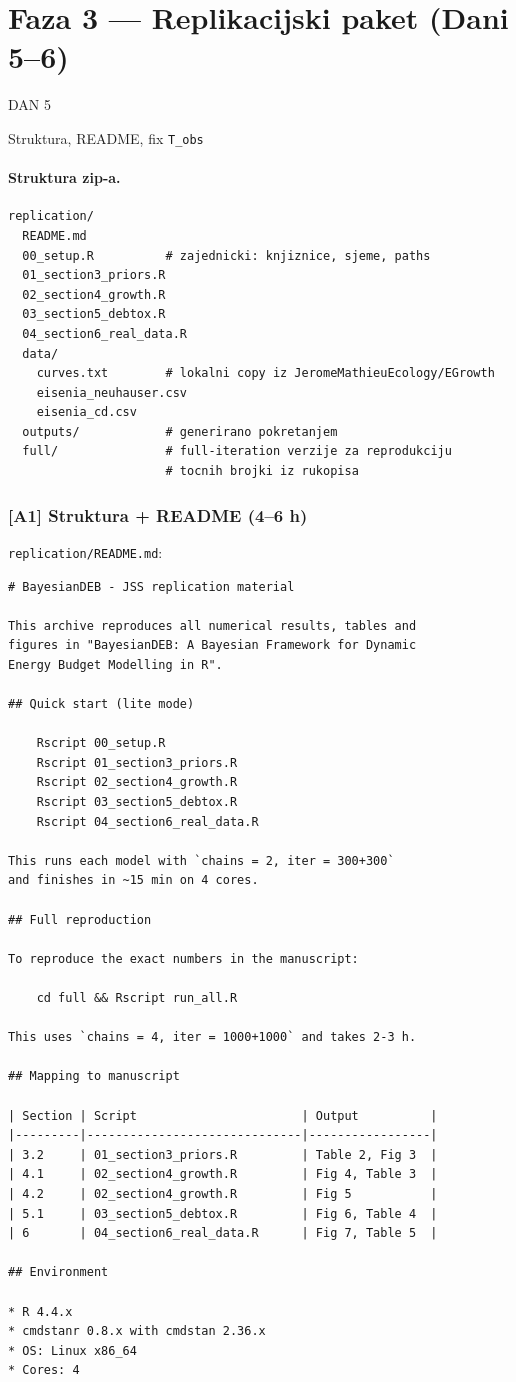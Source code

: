 \documentclass[11pt,a4paper]{article}
\newcommand{\dayhead}[2]{%
  \vspace{0.6em}\par\noindent%
  \colorbox{daygray}{\color{white}\bfseries\strut\;DAN #1\;}\;%
  \colorbox{daylight}{\color{daygray}\strut\;#2\;}\par\vspace{0.4em}%
}
\newcommand{\file}[1]{\texttt{\small #1}}
\begin{document}
\section{Faza 3 --- Replikacijski paket (Dani 5--6)}

\dayhead{5}{Struktura, README, fix \texttt{T\_obs}}

\paragraph{Struktura zip-a.}
\begin{lstlisting}[style=Shellstyle]
replication/
  README.md
  00_setup.R          # zajednicki: knjiznice, sjeme, paths
  01_section3_priors.R
  02_section4_growth.R
  03_section5_debtox.R
  04_section6_real_data.R
  data/
    curves.txt        # lokalni copy iz JeromeMathieuEcology/EGrowth
    eisenia_neuhauser.csv
    eisenia_cd.csv
  outputs/            # generirano pokretanjem
  full/               # full-iteration verzije za reprodukciju
                      # tocnih brojki iz rukopisa
\end{lstlisting}

\subsubsection*{[A1] Struktura + README (4--6 h)}

\file{replication/README.md}:

\begin{lstlisting}[style=Shellstyle]
# BayesianDEB - JSS replication material

This archive reproduces all numerical results, tables and
figures in "BayesianDEB: A Bayesian Framework for Dynamic
Energy Budget Modelling in R".

## Quick start (lite mode)

    Rscript 00_setup.R
    Rscript 01_section3_priors.R
    Rscript 02_section4_growth.R
    Rscript 03_section5_debtox.R
    Rscript 04_section6_real_data.R

This runs each model with `chains = 2, iter = 300+300`
and finishes in ~15 min on 4 cores.

## Full reproduction

To reproduce the exact numbers in the manuscript:

    cd full && Rscript run_all.R

This uses `chains = 4, iter = 1000+1000` and takes 2-3 h.

## Mapping to manuscript

| Section | Script                       | Output          |
|---------|------------------------------|-----------------|
| 3.2     | 01_section3_priors.R         | Table 2, Fig 3  |
| 4.1     | 02_section4_growth.R         | Fig 4, Table 3  |
| 4.2     | 02_section4_growth.R         | Fig 5           |
| 5.1     | 03_section5_debtox.R         | Fig 6, Table 4  |
| 6       | 04_section6_real_data.R      | Fig 7, Table 5  |

## Environment

* R 4.4.x
* cmdstanr 0.8.x with cmdstan 2.36.x
* OS: Linux x86_64
* Cores: 4
\end{lstlisting}
\end{document}
